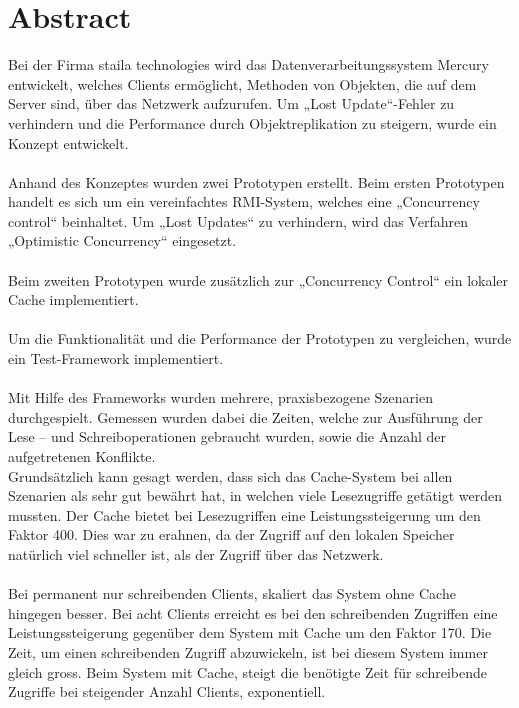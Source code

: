 \chapter*{Abstract}
Bei der Firma staila technologies wird das Datenverarbeitungssystem Mercury entwickelt, welches Clients ermöglicht, Methoden von Objekten, die auf dem Server sind, über das Netzwerk aufzurufen. Um „Lost Update“-Fehler zu verhindern und die Performance durch Objektreplikation zu steigern, wurde ein Konzept entwickelt.\\ \\
Anhand des Konzeptes wurden zwei Prototypen erstellt. Beim ersten Prototypen handelt es sich um ein vereinfachtes RMI-System, welches eine „Concurrency control“ beinhaltet. Um „Lost Updates“ zu verhindern, wird das Verfahren „Optimistic Concurrency“ eingesetzt. \\ \\
Beim zweiten Prototypen wurde zusätzlich zur „Concurrency Control“ ein lokaler Cache implementiert.\\ \\
Um die Funktionalität und die Performance der Prototypen zu vergleichen, wurde ein Test-Framework implementiert.\\ \\
Mit Hilfe des Frameworks wurden mehrere, praxisbezogene Szenarien durchgespielt. Gemessen wurden dabei die Zeiten, welche zur Ausführung der Lese – und Schreiboperationen gebraucht wurden, sowie die Anzahl der aufgetretenen Konflikte.\\
Grundsätzlich kann gesagt werden, dass sich das Cache-System bei allen Szenarien als sehr gut bewährt hat, in welchen viele Lesezugriffe getätigt werden mussten. Der Cache bietet bei Lesezugriffen eine Leistungssteigerung um den Faktor 400. Dies war zu erahnen, da der Zugriff auf den lokalen Speicher natürlich viel schneller ist, als der Zugriff über das Netzwerk.\\ \\
Bei permanent nur schreibenden Clients, skaliert das System ohne Cache hingegen besser. Bei acht Clients erreicht es bei den schreibenden Zugriffen eine Leistungssteigerung gegenüber dem System mit Cache um den Faktor 170. Die Zeit, um einen schreibenden Zugriff abzuwickeln, ist bei diesem System immer gleich gross. Beim System mit Cache, steigt die benötigte Zeit für schreibende Zugriffe bei steigender Anzahl Clients, exponentiell.
